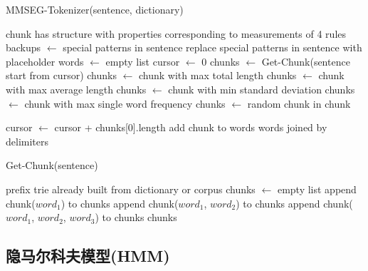 \documentclass[titlepage]{article}
\begin{document}
\begin{algorithm}
    \renewcommand{\thealgorithm}{}
    \caption{MMSEG-Tokenizer(sentence, dictionary)}
    \begin{algorithmic}[1]
        \REQUIRE chunk has structure with properties corresponding to measurements of 4 rules
        \STATE backups $\leftarrow$ special patterns in sentence
        \STATE replace special patterns in sentence with placeholder
        \STATE words $\leftarrow$ empty list
        \STATE cursor $\leftarrow$ 0
        \REPEAT
        \STATE chunks $\leftarrow$ Get-Chunk(sentence start from cursor)
        \STATE chunks $\leftarrow$ chunk with max total length 
        \ENDIF
        \STATE chunks $\leftarrow$ chunk with max average length 
        \ENDIF
        \STATE chunks $\leftarrow$ chunk with min standard deviation 
        \ENDIF
        \STATE chunks $\leftarrow$ chunk with max single word frequency 
        \ENDIF
        \STATE chunks $\leftarrow$ random chunk in chunk 
        \ENDIF
        
        \STATE cursor $\leftarrow$ cursor + chunks[0].length
        \STATE add chunk to words
        \RETURN words joined by delimiters
    \end{algorithmic}
\end{algorithm}

\begin{algorithm}[H]
    \renewcommand{\thealgorithm}{}
    \caption{Get-Chunk(sentence)}
    \begin{algorithmic}[1]
        \REQUIRE prefix trie already built from dictionary or corpus
        \STATE chunks $\leftarrow$ empty list
        \STATE append chunk($word_1$) to chunks
        \STATE append chunk($word_1$, $word_2$) to chunks
        \STATE append chunk($word_1$, $word_2$, $word_3$) to chunks
        \ENDFOR
        \ENDFOR
        \ENDFOR
        \RETURN chunks
    \end{algorithmic}
\end{algorithm}

\subsection{隐马尔科夫模型(HMM)}
\end{document}

